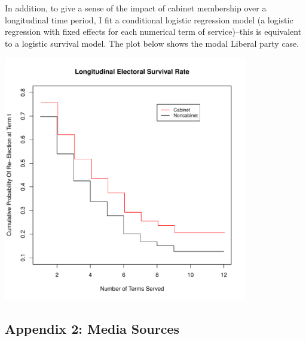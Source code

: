 \documentclass[letter,12pt]{article}
\begin{document}


In addition, to give a sense of the impact of cabinet membership over a longitudinal time period, I fit a conditional logistic regression model (a logistic regression with fixed effects for each numerical term of service)--this is equivalent to a logistic survival model. The plot below shows the modal Liberal party case. 

\begin{center}
	\includegraphics[width = 0.8\textwidth]{includes/cumulative_survival}
\end{center}

\pagebreak

\subsection*{Appendix 2: Media Sources}


\newpage
\end{document}
